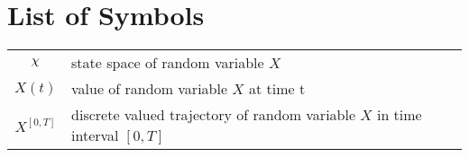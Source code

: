 \chapter*{List of Symbols}

\begin{tabular}{cp{}}
	$ \rchi $ & state space of random variable $ X $ \\
	$ X(t) $ & value of random variable $X$ at time t \\
	$ X^{[0, T]} $ & discrete valued trajectory of random variable $ X $ in time interval $ [0, T] $ \\
\end{tabular}\\
